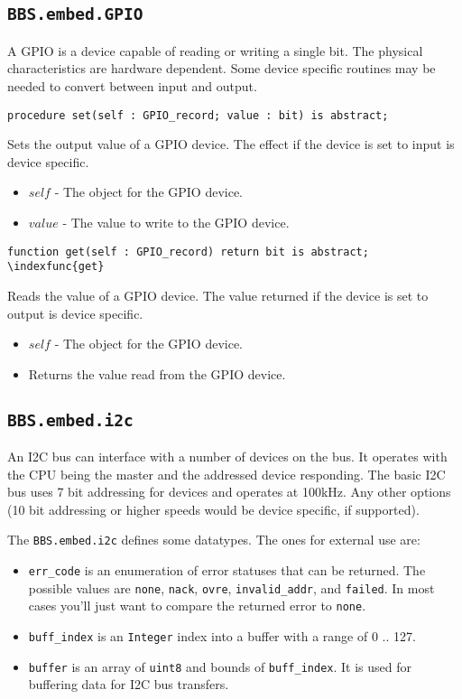 \documentclass[10pt, openany]{book}
\newcommand{\indextype}[1]{\index[type]{#1}}
\newcommand{\indexfunc}[1]{\index[func]{#1}}
\newcommand{\package}[1]{\texttt{#1}}
\newcommand{\datatype}[1]{\texttt{#1}}
\begin{document}
\subsection{\package{BBS.embed.GPIO}}
A GPIO is a device capable of reading or writing a single bit.  The physical characteristics are hardware dependent.  Some device specific routines may be needed to convert between input and output.

\begin{lstlisting}
procedure set(self : GPIO_record; value : bit) is abstract;
\end{lstlisting}
\indexfunc{set}
Sets the output value of a GPIO device.  The effect if the device is set to input is device specific.
\begin{itemize}
  \item $self$ - The object for the GPIO device.
  \item $value$ - The value to write to the GPIO device.
\end{itemize}

\begin{lstlisting}
function get(self : GPIO_record) return bit is abstract;
\indexfunc{get}
\end{lstlisting}
Reads the value of a GPIO device.  The value returned if the device is set to output is device specific.
\begin{itemize}
  \item $self$ - The object for the GPIO device.
  \item Returns the value read from the GPIO device.
\end{itemize}

\subsection{\package{BBS.embed.i2c}}
An I2C bus can interface with a number of devices on the bus.  It operates with the CPU being the master and the addressed device responding.  The basic I2C bus uses 7 bit addressing for devices and operates at 100kHz.  Any other options (10 bit addressing or higher speeds would be device specific, if supported).

The \package{BBS.embed.i2c} defines some datatypes.  The ones for external use are:
\begin{itemize}
  \item \datatype{err\_code} is an enumeration of error statuses that can be returned.  The possible values are \datatype{none}, \datatype{nack}, \datatype{ovre}, \datatype{invalid\_addr}, and \datatype{failed}.  In most cases you'll just want to compare the returned error to \datatype{none}.
  \item \datatype{buff\_index} is an \datatype{Integer} index into a buffer with a range of 0 .. 127.
  \item \datatype{buffer} is an array of \datatype{uint8} and bounds of \datatype{buff\_index}.  It is used for buffering data for I2C bus transfers.
\end{itemize}
\indextype{err\_code}
\indextype{buff\_index}
\indextype{buffer}
\end{document}
